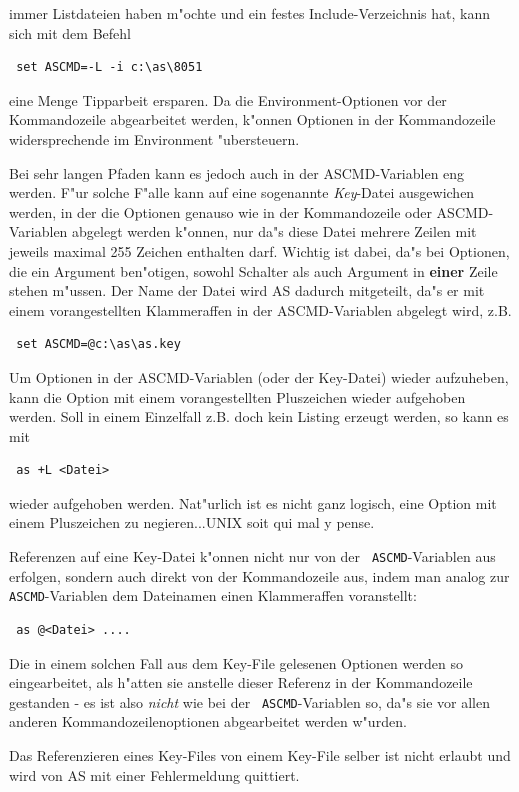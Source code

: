 \documentclass[12pt,a4paper,twoside]{report}
\newcommand{\ii}[1]{{\it #1}}
\newcommand{\bb}[1]{{\bf #1}}
\newcommand{\asname}{AS}
\begin{document}
immer Listdateien haben m"ochte und ein festes Include-Verzeichnis hat,
kann sich mit dem Befehl
\begin{verbatim}
 set ASCMD=-L -i c:\as\8051
\end{verbatim}
eine Menge Tipparbeit ersparen.  Da die Environment-Optionen vor der
Kommandozeile abgearbeitet werden, k"onnen Optionen in der
Kommandozeile widersprechende im Environment "ubersteuern.
\par
Bei sehr langen Pfaden kann es jedoch auch in der ASCMD-Variablen eng
werden.  F"ur solche F"alle kann auf eine sogenannte \ii{Key}-Datei
ausgewichen werden, in der die Optionen genauso wie in der Kommandozeile
oder ASCMD-Variablen abgelegt werden k"onnen, nur da"s diese Datei
mehrere Zeilen mit jeweils maximal 255 Zeichen enthalten darf.  Wichtig
ist dabei, da"s bei Optionen, die ein Argument ben"otigen, sowohl Schalter
als auch Argument in \bb{einer} Zeile stehen m"ussen.  Der Name der
Datei wird \asname{} dadurch mitgeteilt, da"s er mit einem vorangestellten
Klammeraffen in der ASCMD-Variablen abgelegt wird, z.B.
\begin{verbatim}
 set ASCMD=@c:\as\as.key
\end{verbatim}
Um Optionen in der ASCMD-Variablen (oder der Key-Datei) wieder aufzuheben,
kann die Option mit einem vorangestellten Pluszeichen wieder aufgehoben
werden.  Soll in einem Einzelfall z.B. doch kein Listing erzeugt werden,
so kann es mit
\begin{verbatim}
 as +L <Datei>
\end{verbatim}
wieder aufgehoben werden.  Nat"urlich ist es nicht ganz logisch, eine
Option mit einem Pluszeichen zu negieren...UNIX soit qui mal y pense.
\par
Referenzen auf eine Key-Datei k"onnen nicht nur von der {\tt
ASCMD}-Variablen aus erfolgen, sondern auch direkt von der Kommandozeile
aus, indem man analog zur {\tt ASCMD}-Variablen dem Dateinamen einen
Klammeraffen voranstellt:
\begin{verbatim}
 as @<Datei> ....
\end{verbatim}
Die in einem solchen Fall aus dem Key-File gelesenen Optionen werden so
eingearbeitet, als h"atten sie anstelle dieser Referenz in der
Kommandozeile gestanden - es ist also {\em nicht} wie bei der {\tt
ASCMD}-Variablen so, da"s sie vor allen anderen Kommandozeilenoptionen
abgearbeitet werden w"urden.
\par
Das Referenzieren eines Key-Files von einem Key-File selber ist nicht
erlaubt und wird von \asname{} mit einer Fehlermeldung quittiert.
\end{document}
